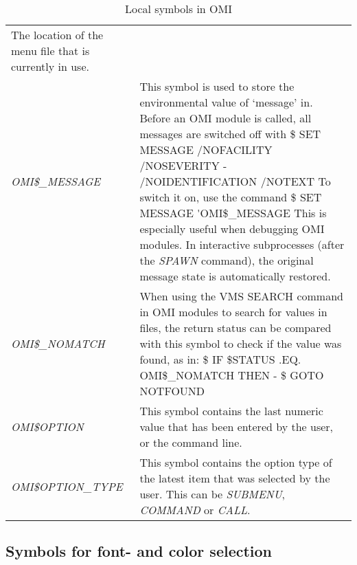 \documentclass[a4paper]{book}
\renewcommand{\indent}{\hspace*{5mm}}
\begin{document}
\begin{table}[h!tb]
\begin{minipage}[h!tb]{\textwidth}
\begin{tabular}{lp{9cm}}
The location of the menu file that is currently in use. \\
\textsl{OMI{\$}{\_}MESSAGE}\index{OMI commands in modules!debugging}\index{OMI{\$}{\_}MESSAGE}\index{OMI symbols!local symbols!OMI{\$}{\_}MESSAGE} & 
This symbol is used to store the environmental value of `message' in. Before
an OMI module is called, all messages are switched off with \newline
\indent\small{\textsf{{\$} SET MESSAGE /NOFACILITY /NOSEVERITY -}} \newline
\indent\indent\small{\textsf{/NOIDENTIFICATION /NOTEXT}} \newline
To switch it on, use the command \newline
\indent\small{\textsf{{\$} SET MESSAGE \'{}OMI{\$}{\_}MESSAGE}} \newline
This is especially useful when debugging OMI modules. In interactive subprocesses
(after the \textsl{SPAWN} command), the original message state is
automatically restored. \\
\textsl{OMI{\$}{\_}NOMATCH}\index{OMI{\$}{\_}NOMATCH}\index{OMI symbols!local symbols!OMI{\$}{\_}NOMATCH} & 
When using the VMS SEARCH command in OMI modules to search for 
values in files, the return status can be compared with this 
symbol to check if the value was found, as in: \linebreak
\indent\small{\textsf{{\$} IF {\$}STATUS .EQ. OMI{\$}{\_}NOMATCH THEN -}}\newline
\indent\indent\small{\textsf{{\$} GOTO NOTFOUND}}\\
\textsl{OMI{\$}OPTION}\index{OMI{\$}OPTION}\index{OMI symbols!local symbols!OMI{\$}OPTION} & 
This symbol contains the last numeric value that has been entered 
by the user, or the command line. \\
\textsl{OMI{\$}OPTION\_TYPE}\index{OMI{\$}OPTION\_TYPE}\index{OMI symbols!local symbols!OMI{\$}OPTION\_TYPE} & 
This symbol contains the option type of the latest item that was selected by
the user. This can be \textsl{SUBMENU}, \textsl{COMMAND} or \textsl{CALL}. \\
\hline
\end{tabular}
\caption{Local symbols in OMI}\label{tab:locsymbols}
\end{minipage}
\end{table}

\subsection{Symbols for font- and color selection}\label{subsection:fontcolors}
\end{document}
